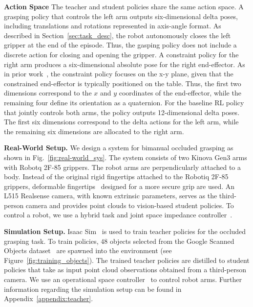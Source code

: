 \textbf{Action Space}
The teacher and student policies share the same action space.
A grasping policy that controls the left arm outputs six-dimensional delta poses, including translations and rotations represented in axis-angle format.
As described in Section~\ref{sec:task_desc}, the robot autonomously closes the left gripper at the end of the episode.
Thus, the gasping policy does not include a discrete action for closing and opening the gripper.
A constraint policy for the right arm produces a six-dimensional absolute pose for the right end-effector.
As in prior work~\cite{shao2020learning}, the constraint policy focuses on the x-y plane, given that the constrained end-effector is typically positioned on the table.
Thus, the first two dimensions correspond to the $x$ and $y$ coordinates of the end-effector, while the remaining four define its orientation as a quaternion.
For the baseline RL policy that jointly controls both arms, the policy outputs 12-dimensional delta poses. 
The first six dimensions correspond to the delta actions for the left arm, while the remaining six dimensions are allocated to the right arm.




\textbf{Real-World Setup.}
We design a system for bimanual occluded grasping as shown in Fig.~\ref{fig:real-world_sys}.
The system consists of two Kinova Gen3 arms with Robotq 2F-85 grippers.
The robot arms are perpendicularly attached to a body.
Instead of the original rigid fingertips attached to the Robotiq 2F-85 grippers, deformable fingertips~\cite{chi2024universal} designed for a more secure grip are used.
An L515 Realsense camera, with known extrinsic parameters, serves as the third-person camera and provides point clouds to vision-based student policies.
To control a robot, we use a hybrid task and joint space impedance controller~\cite{kim2019model}.

\textbf{Simulation Setup.}
Isaac Sim~\cite{IsaacDeveloper} is used to train teacher policies for the occluded grasping task.
To train policies, $48$ objects selected from the Google Scanned Objects dataset~\cite{downs2022googlescannedobjectshighquality} are spawned into the environment (see Figure~\ref{fig:training_objects}).
The trained teacher policies are distilled to student policies that take as input point cloud observations obtained from a third-person camera.
We use an operational space controller~\cite{khatib1987unified} to control robot arms.
Further information regarding the simulation setup can be found in Appendix~\ref{appendix:teacher}.






